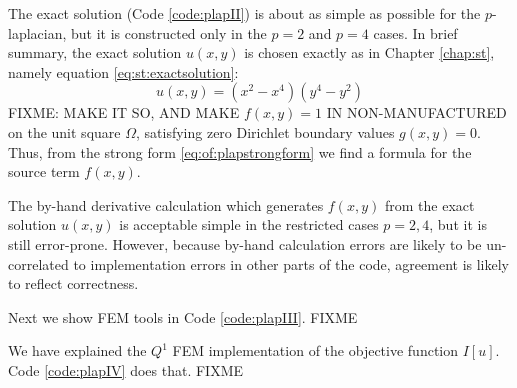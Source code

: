 The exact solution (Code \ref{code:plapII}) is about as simple as possible for the $p$-laplacian, but it is constructed only in the $p=2$ and $p=4$ cases.  In brief summary, the exact solution $u(x,y)$ is chosen exactly as in Chapter \ref{chap:st}, namely equation \eqref{eq:st:exactsolution}:
\begin{equation}
    u(x,y) = (x^2 - x^4) (y^4 - y^2) \label{eq:of:exactsolution}
\end{equation}
FIXME: MAKE IT SO, AND MAKE $f(x,y)=1$ IN NON-MANUFACTURED on the unit square $\Omega$, satisfying zero Dirichlet boundary values $g(x,y)=0$.  Thus, from the strong form \eqref{eq:of:plapstrongform} we find a formula for the source term $f(x,y)$.

\clearpage
{}

The by-hand derivative calculation which generates $f(x,y)$ from the exact solution $u(x,y)$ is acceptable simple in the restricted cases $p=2,4$, but it is still error-prone.  However, because by-hand calculation errors are likely to be un-correlated to implementation errors in other parts of the code, agreement is likely to reflect correctness.

\clearpage
{}

Next we show FEM tools in Code \ref{code:plapIII}.  FIXME

\clearpage
{}

We have explained the $Q^1$ FEM implementation of the objective function $I[u]$.  Code \ref{code:plapIV} does that.  FIXME

\clearpage
{}

